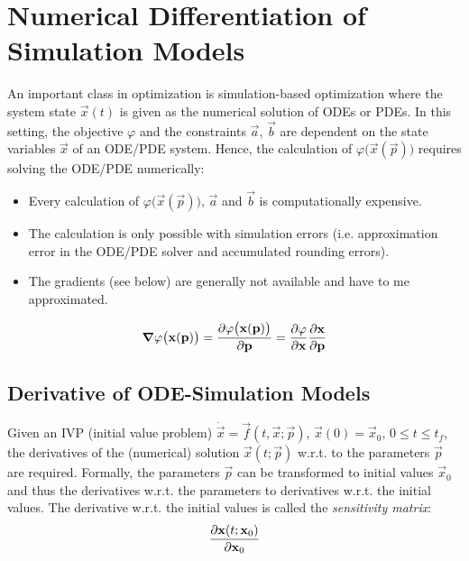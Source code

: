 	\section{Numerical Differentiation of Simulation Models}
		An important class in optimization is simulation-based optimization where the system state \( \vec{x}(t) \) is given as the numerical solution of ODEs or PDEs. In this setting, the objective \(\varphi\) and the constraints \(\vec{a}\), \(\vec{b}\) are dependent on the state variables \(\vec{x}\) of an ODE/PDE system. Hence, the calculation of \( \varphi\big(\vec{x}(\vec{p})\big) \) requires solving the ODE/PDE numerically:
		\begin{itemize}
			\item Every calculation of \( \varphi\big(\vec{x}(\vec{p})\big) \), \(\vec{a}\) and \(\vec{b}\) is computationally expensive.
			\item The calculation is only possible with simulation errors (i.e. approximation error in the ODE/PDE solver and accumulated rounding errors).
			\item The gradients (see below) are generally not available and have to me approximated.
		\end{itemize}
		\begin{align*}
			\grad{\varphi}\big(\boldsymbol{\mathrm{x}}(\boldsymbol{\mathrm{p}})\big) = \pdv{\varphi\big(\boldsymbol{\mathrm{x}}(\boldsymbol{\mathrm{p}})\big)}{\boldsymbol{\mathrm{p}}} = \pdv{\varphi}{\boldsymbol{\mathrm{x}}} \pdv{\boldsymbol{\mathrm{x}}}{\boldsymbol{\mathrm{p}}}
		\end{align*}

		\subsection{Derivative of ODE-Simulation Models}
			\label{subsec:derivativeOde}
		
			Given an IVP (initial value problem) \( \dot{\vec{x}} = \vec{f}(t, \vec{x}; \vec{p}) \), \( \vec{x}(0) = \vec{x}_0 \), \( 0 \leq t \leq t_f \), the derivatives of the (numerical) solution \( \vec{x}(t; \vec{p}) \) w.r.t. to the parameters \( \vec{p} \) are required. Formally, the parameters \(\vec{p}\) can be transformed to initial values \(\vec{x}_0\) and thus the derivatives w.r.t. the parameters to derivatives w.r.t. the initial values. The derivative w.r.t. the initial values is called the \emph{sensitivity matrix}:
			\begin{align*}
				\pdv{\boldsymbol{\mathrm{x}}(t; \boldsymbol{\mathrm{x}}_0)}{\boldsymbol{\mathrm{x}}_0}
			\end{align*}
			

